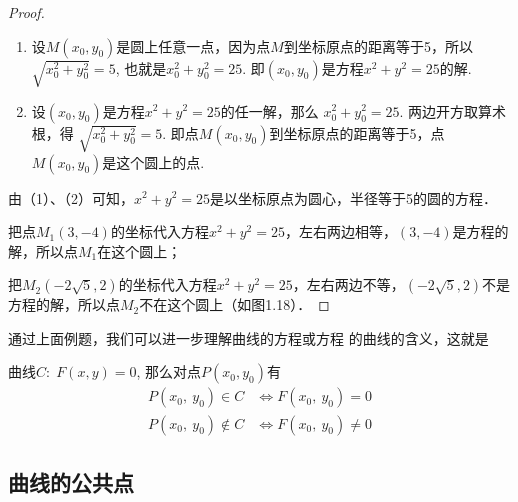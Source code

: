 \begin{proof}
\begin{enumerate}[(1)]
    \item 设$M(x_0,y_0)$是圆上任意一点，因为点$M$到坐标原点的距离等于5，所以
    $\sqrt{x^2_0+y^2_0}=5$, 也就是$x^2_0+y^2_0=25$.
    即$(x_0,y_0)$是方程$x^2+y^2=25$的解.
    \item 设$(x_0,y_0)$是方程$x^2+y^2=25$的任一解，那么
    $x^2_0+y^2_0=25$.
    两边开方取算术根，得
    $\sqrt{x^2_0+y^2_0}=5$.
  即点$M(x_0,y_0)$到坐标原点的距离等于5，点$M(x_0,y_0)$是这个圆上的点.
\end{enumerate}    

\noindent
\begin{minipage}{.55\textwidth}
\CTEXindent 由（1）、（2）可知，$x^2+y^2=25$是以坐标原点为圆心，半径等于5的圆的方程．

把点$M_1(3,-4)$的坐标代入方程$x^2+y^2=25$，左右两边相等，$(3,-4)$是方程的解，所以点$M_1$在这个圆上；
    
把$M_2(-2\sqrt{5},2)$的坐标代入方程$x^2+y^2=25$，左右两边不等，$(-2\sqrt{5},2)$不是方程的解，所以点$M_2$不在这个圆上（如图1.18）．

\end{minipage}\hfill
\begin{minipage}{.4\textwidth}
\centering
{}
\end{minipage}
\end{proof}    

通过上面例题，我们可以进一步理解曲线的方程或方程
的曲线的含义，这就是

曲线$C:\; F(x,y)=0$, 那么对点$P(x_0,y_0)$有
\[\begin{split}
    P(x_0,\:y_0) \in C&\Longleftrightarrow F(x_0,\:y_0)=0\\
P(x_0,\:y_0)\notin C&\Longleftrightarrow F(x_0,\:y_0)\ne 0
\end{split}\]

\subsection{曲线的公共点}

